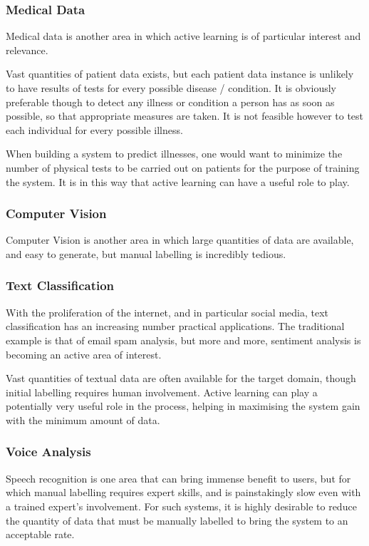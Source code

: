 \documentclass[a4paper,11pt]{report}
\begin{document}
\subsubsection{Medical Data}
Medical data is another area in which active learning is of particular interest and relevance.

Vast quantities of patient data exists, but each patient data instance is unlikely to have results of tests for every possible disease / condition. It is obviously preferable though to detect any illness or condition a person has as soon as possible, so that appropriate measures are taken. It is not feasible however to test each individual for every possible illness.

When building a system to predict illnesses, one would want to minimize the number of physical tests to be carried out on patients for the purpose of training the system. It is in this way that active learning can have a useful role to play.

\subsubsection{Computer Vision}
Computer Vision is another area in which large quantities of data are available, and easy to generate, but manual labelling is incredibly tedious.

\subsubsection{Text Classification}
With the proliferation of the internet, and in particular social media, text classification has an increasing number practical applications. The traditional example is that of email spam analysis, but more and more, sentiment analysis is becoming an active area of interest.

Vast quantities of textual data are often available for the target domain, though initial labelling requires human involvement. Active learning can play a potentially very useful role in the process, helping in maximising the system gain with the minimum amount of data.

\subsubsection{Voice Analysis}

Speech recognition is one area that can bring immense benefit to users, but for which manual labelling requires expert skills, and is painstakingly slow even with a trained expert's involvement. For such systems, it is highly desirable to reduce the quantity of data that must be manually labelled to bring the system to an acceptable rate.
\end{document}
